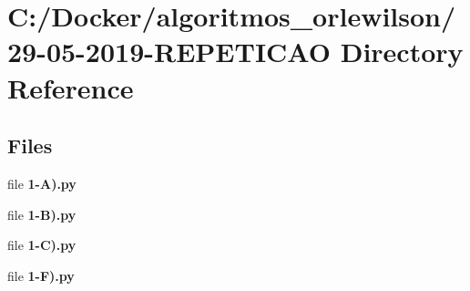 \section{C\+:/\+Docker/algoritmos\+\_\+orlewilson/29-\/05-\/2019-\/\+R\+E\+P\+E\+T\+I\+C\+AO Directory Reference}
\label{dir_a3f37b271daeb804bbbb62d78e10e7d0}
\subsection*{Files}
\begin{DoxyCompactItemize}
\item 
file \textbf{ 1-\/\+A).\+py}
\item 
file \textbf{ 1-\/\+B).\+py}
\item 
file \textbf{ 1-\/\+C).\+py}
\item 
file \textbf{ 1-\/\+F).\+py}
\end{DoxyCompactItemize}
